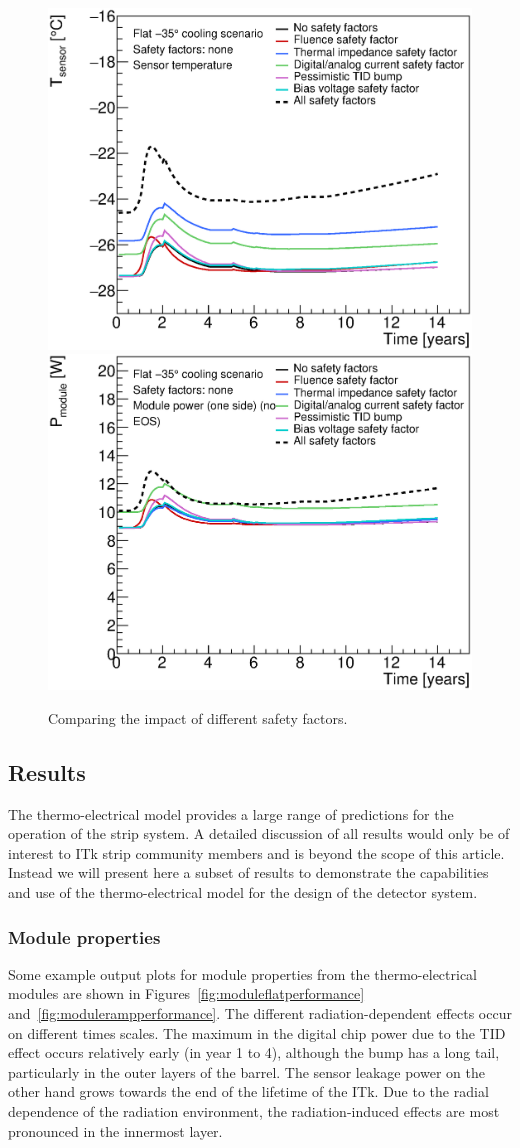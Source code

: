 \begin{figure}[ht]
\centering
\includegraphics[width=0.49\linewidth]{figures/CompareSafetyFactors_SensorTemperature_R3.eps}
\includegraphics[width=0.49\linewidth]{figures/CompareSafetyFactors_ModulePower_R3.eps}
\caption{Comparing the impact of different safety factors.}
\label{fig:safety_factors}
\end{figure}

\subsection{Results}
The thermo-electrical model provides a large range of predictions for the operation of the strip system. A detailed discussion of all results would only be of interest to ITk strip community members and is beyond the scope of this article. Instead we will present here a subset of results to demonstrate the capabilities and use of the thermo-electrical model for the design of the detector system.

\subsubsection{Module properties}

Some example output plots for module properties from the thermo-electrical modules are shown in Figures~\ref{fig:moduleflatperformance} and~\ref{fig:modulerampperformance}. The different radiation-dependent effects occur on different times scales. The maximum in the digital chip power due to the TID effect occurs relatively early (in year 1 to 4), although the bump has a long tail, particularly in the outer layers of the barrel. The sensor leakage power on the other hand grows towards the end of the lifetime of the ITk. Due to the radial dependence of the radiation environment, the radiation-induced effects are most pronounced in the innermost layer.


